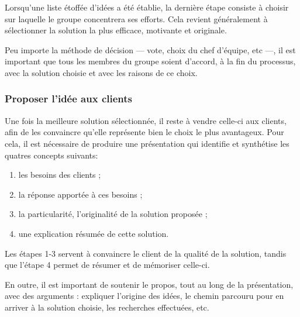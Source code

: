 Lorsqu'une liste étoffée d'idées a été établie, la dernière étape consiste à choisir sur laquelle le groupe concentrera ses efforts. Cela revient généralement à sélectionner la solution la plus efficace, motivante et originale.

Peu importe la méthode de décision --- vote, choix du chef d'équipe, etc ---, il est important que tous les membres du groupe soient d'accord, à la fin du processus, avec la solution choisie et avec les raisons de ce choix.


\subsubsection{Proposer l'idée aux clients}

Une fois la meilleure solution sélectionnée, il reste à \og{}vendre\fg{} celle-ci aux clients, afin de les convaincre qu'elle représente bien le choix le plus avantageux. Pour cela, il est nécessaire de produire une présentation qui identifie et synthétise les quatres concepts suivants:

\begin{enumerate}
    \item les besoins des clients ;
    \item la réponse apportée à ces besoins ;
    \item la particularité, l'originalité de la solution proposée ;
    \item une explication résumée de cette solution.
\end{enumerate}

Les étapes 1-3 servent à convaincre le client de la qualité de la solution, tandis que l'étape 4 permet de résumer et de mémoriser celle-ci.

En outre, il est important de soutenir le propos, tout au long de la présentation, avec des arguments : expliquer l'origine des idées, le chemin parcouru pour en arriver à la solution choisie, les recherches effectuées, etc.












